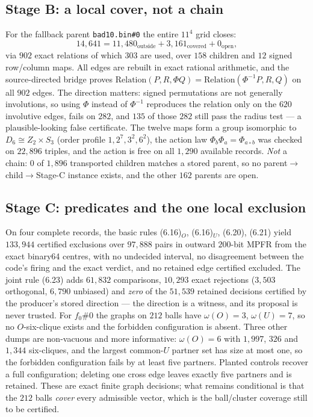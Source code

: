 \documentclass[10pt]{article}
\theoremstyle{definition}
\begin{document}
\subsection{Stage B: a local cover, not a chain}\label{sec:stageb}
For the fallback parent \texttt{bad10.bin\#0} the entire $11^4$ grid closes:
\[
14{,}641=11{,}480_{\text{outside}}+3{,}161_{\text{covered}}+0_{\text{open}} ,
\]
via $902$ exact relations of which $303$ are used, over $158$ children and $12$ signed row/column
maps. All edges are rebuilt in exact rational arithmetic, and the source-directed bridge proves
$\mathrm{Relation}(P,R,\Phi Q)=\mathrm{Relation}(\Phi^{-1}P,R,Q)$ on all $902$ edges. The direction
matters: signed permutations are not generally involutions, so using $\Phi$ instead of $\Phi^{-1}$
reproduces the relation only on the $620$ involutive edges, fails on $282$, and $135$ of those $282$
still pass the radius test --- a plausible-looking false certificate. The twelve maps form a group
isomorphic to $D_6\cong Z_2\times S_3$ (order profile $1,2^7,3^2,6^2$), the action law
$\Phi_b\Phi_a=\Phi_{a\circ b}$ was checked on $22{,}896$ triples, and the action is free on all
$1{,}290$ available records. \emph{Not} a chain: $0$ of $1{,}896$ transported children matches a stored
parent, so no parent$\to$child$\to$Stage-C instance exists, and the other $162$ parents are open.

\subsection{Stage C: predicates and the one local exclusion}\label{sec:stagecx}
On four complete records, the basic rules (6.16)$_O$, (6.16)$_U$, (6.20), (6.21) yield $133{,}944$
certified exclusions over $97{,}888$ pairs in outward $200$-bit MPFR from the exact binary64
centres, with no undecided interval, no disagreement between the code's firing and the exact verdict,
and no retained edge certified excluded. The joint rule (6.23) adds $61{,}832$ comparisons,
$10{,}293$ exact rejections ($3{,}503$ orthogonal, $6{,}790$ unbiased) and \emph{zero} of the
$51{,}539$ retained decisions certified by the producer's stored direction --- the direction is a
witness, and its proposal is never trusted. For $f_0\#0$ the graphs on $212$ balls have
$\omega(O)=3$, $\omega(U)=7$, so no $O$-six-clique exists and the forbidden configuration is absent.
Three other dumps are non-vacuous and more informative: $\omega(O)=6$ with $1{,}997$, $326$ and
$1{,}344$ six-cliques, and the largest common-$U$ partner set has size at most one, so the forbidden
configuration fails by at least five partners. Planted controls recover a full configuration; deleting
one cross edge leaves exactly five partners and is retained. These are exact finite graph decisions;
what remains conditional is that the $212$ balls \emph{cover} every admissible vector, which is the
ball/cluster coverage still to be certified.
\end{document}

